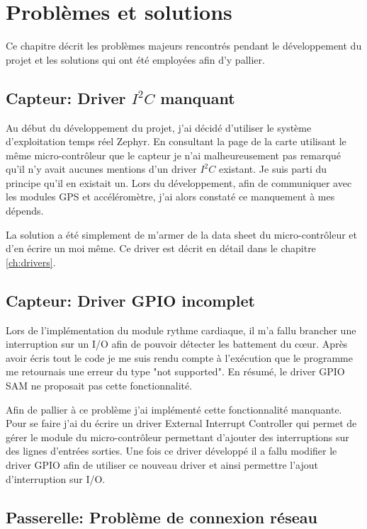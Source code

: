 
\chapter{Problèmes et solutions}\label{ch:prob_solutions}

Ce chapitre décrit les problèmes majeurs rencontrés pendant le développement du projet et les solutions qui ont été employées afin d'y pallier.

\section{Capteur: Driver $I^{2}C$ manquant}

Au début du développement du projet, j'ai décidé d'utiliser le système d'exploitation temps réel Zephyr. En consultant la page de la carte utilisant le même micro-contrôleur que le capteur je n'ai malheureusement pas remarqué qu'il n'y avait aucunes mentions d'un driver $I^{2}C$ existant. Je suis parti du principe qu'il en existait un. Lors du développement, afin de communiquer avec les modules GPS et accéléromètre, j'ai alors constaté ce manquement à mes dépends.

La solution a été simplement de m'armer de la data sheet du micro-contrôleur et d'en écrire un moi même. Ce driver est décrit en détail dans le chapitre \ref{ch:drivers}.

\section{Capteur: Driver GPIO incomplet}

Lors de l'implémentation du module rythme cardiaque, il m'a fallu brancher une interruption sur un I/O afin de pouvoir détecter les battement du cœur. Après avoir écris tout le code je me suis rendu compte à l'exécution que le programme me retournais une erreur du type "not supported". En résumé, le driver GPIO SAM ne proposait pas cette fonctionnalité.

Afin de pallier à ce problème j'ai implémenté cette fonctionnalité manquante. Pour se faire j'ai du écrire un driver External Interrupt Controller qui permet de gérer le module du micro-contrôleur permettant d'ajouter des interruptions sur des lignes d'entrées sorties. Une fois ce driver développé il a fallu modifier le driver GPIO afin de utiliser ce nouveau driver et ainsi permettre l'ajout d'interruption sur I/O.

\section{Passerelle: Problème de connexion réseau}

